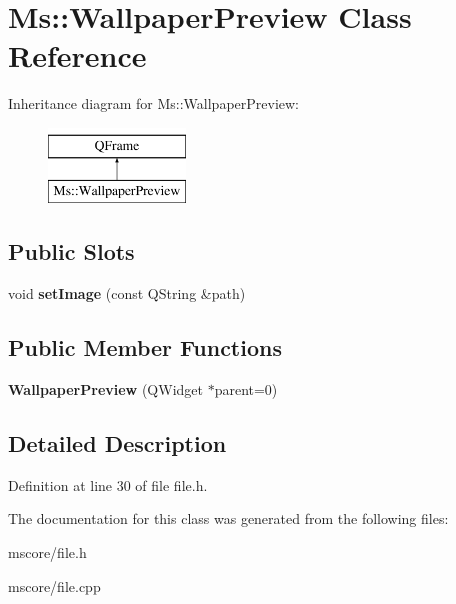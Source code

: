\hypertarget{class_ms_1_1_wallpaper_preview}{}\section{Ms\+:\+:Wallpaper\+Preview Class Reference}
\label{class_ms_1_1_wallpaper_preview}
Inheritance diagram for Ms\+:\+:Wallpaper\+Preview\+:\begin{figure}[H]
\begin{center}
\leavevmode
\includegraphics[height=2.000000cm]{class_ms_1_1_wallpaper_preview}
\end{center}
\end{figure}
\subsection*{Public Slots}
\begin{DoxyCompactItemize}
\item 
\mbox{\label{class_ms_1_1_wallpaper_preview_aa05eec1bdbf0b42b91db1a2bbd5dacf2}} 
void {\bfseries set\+Image} (const Q\+String \&path)
\end{DoxyCompactItemize}
\subsection*{Public Member Functions}
\begin{DoxyCompactItemize}
\item 
\mbox{\label{class_ms_1_1_wallpaper_preview_a536b879f39b828758abd34d33b7ef6cd}} 
{\bfseries Wallpaper\+Preview} (Q\+Widget $\ast$parent=0)
\end{DoxyCompactItemize}


\subsection{Detailed Description}


Definition at line 30 of file file.\+h.



The documentation for this class was generated from the following files\+:\begin{DoxyCompactItemize}
\item 
mscore/file.\+h\item 
mscore/file.\+cpp\end{DoxyCompactItemize}

